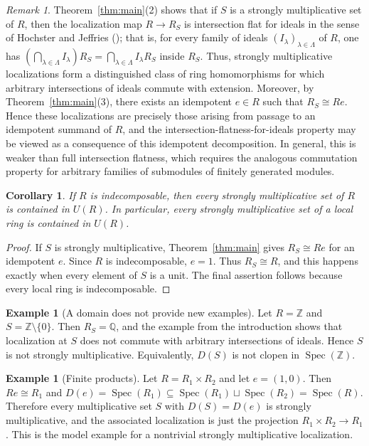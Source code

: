 \documentclass[11pt]{amsart}
\newtheorem{corollary}[theorem]{Corollary}
\theoremstyle{definition}
\newtheorem{example}[theorem]{Example}
\theoremstyle{remark}
\newtheorem{remark}[theorem]{Remark}
\newcommand{\Spec}{\operatorname{Spec}}
\begin{document}
\begin{remark}
Theorem~\ref{thm:main}(2) shows that if $S$ is a strongly multiplicative set of $R$, then the localization map
$R \longrightarrow R_S$ is intersection flat for ideals in the sense of Hochster and Jeffries (\cite{HochsterJeffries}); that is, for every family of ideals $(I_\lambda)_{\lambda\in\Lambda}$ of $R$, one has
$\left(\bigcap_{\lambda\in\Lambda} I_\lambda\right)R_S = \bigcap_{\lambda\in\Lambda} I_\lambda R_S$ inside $R_S$. Thus, strongly multiplicative localizations form a distinguished class of ring homomorphisms for which arbitrary intersections of ideals commute with extension. Moreover, by Theorem~\ref{thm:main}(3), there exists an idempotent $e\in R$ such that $R_S \cong Re.$
Hence these localizations are precisely those arising from passage to an idempotent summand of $R$, and the intersection-flatness-for-ideals property may be viewed as a consequence of this idempotent decomposition. In general, this is weaker than full intersection flatness, which requires the analogous commutation property for arbitrary families of submodules of finitely generated modules.
\end{remark}

\begin{corollary}\label{cor:indecomp}
If $R$ is indecomposable, then every strongly multiplicative set of $R$ is contained in $U(R)$.
In particular, every strongly multiplicative set of a local ring is contained in $U(R)$.
\end{corollary}

\begin{proof}
If $S$ is strongly multiplicative, Theorem~\ref{thm:main} gives $R_S \cong Re$ for an idempotent $e$.
Since $R$ is indecomposable, $e=1$.
Thus $R_S \cong R$, and this happens exactly when every element of $S$ is a unit.
The final assertion follows because every local ring is indecomposable.
\end{proof}

\begin{example}[A domain does not provide new examples]\label{ex:domain}
Let $R=\mathbb{Z}$ and $S=\mathbb{Z}\setminus\{0\}$.
Then $R_S=\mathbb{Q}$, and the example from the introduction shows that localization at $S$ does not commute with arbitrary intersections of ideals.
Hence $S$ is not strongly multiplicative.
Equivalently, $D(S)$ is not clopen in $\Spec(\mathbb{Z})$.
\end{example}

\begin{example}[Finite products]\label{ex:product}
Let $R=R_1 \times R_2$ and let $e=(1,0)$.
Then $Re \cong R_1$ and $D(e)=\Spec(R_1) \subseteq \Spec(R_1) \sqcup \Spec(R_2)=\Spec(R)$.
Therefore every multiplicative set $S$ with $D(S)=D(e)$ is strongly multiplicative, and the associated localization is just the projection $R_1 \times R_2 \to R_1$.
This is the model example for a nontrivial strongly multiplicative localization.
\end{example}
\end{document}
